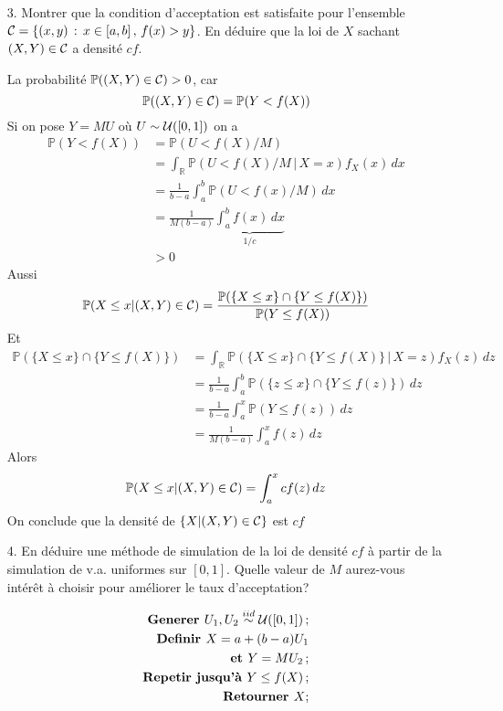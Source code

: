 \documentclass[a4paper]{article}
\begin{document}
\begin{enumerate}
\item[3.] Montrer que la condition d'acceptation est satisfaite pour l'ensemble ${\cal C} = \{(x,y)\,:\,x\in[a,b]\,,\,f(x)>y\}$. En d\'eduire que la loi de $X$ sachant $(X,Y)\in{\cal C}$ a densit\'e $cf$.

La probabilit\'e $\mathbb{P}((X,Y)\in{\cal C})>0$, car
$$\mathbb{P}((X,Y)\in{\cal C})= \mathbb{P}(Y<f(X))$$
Si on pose $Y = MU$ o\`u $U\sim{\cal U}([0,1])$ on a
\begin{align*}
\mathbb{P}(Y<f(X)) &= \mathbb{P}(U< f(X)/M)\\
&= \int_{\mathbb{R}}\mathbb{P}(U<f(X)/M\,|\,X=x)f_X(x)\,dx\\
&= \frac{1}{b-a}\int_a^b\mathbb{P}(U<f(x)/M)\,dx\\
&= \frac{1}{M(b-a)}\underbrace{\int_a^bf(x)\,dx}_{1/c}\\
&> 0
\end{align*}
Aussi
$$\mathbb{P}(X\leq x |(X,Y)\in{\cal C}) = \frac{\mathbb{P}(\{X\leq x\}\cap\{Y\leq f(X)\})}{\mathbb{P}(Y\leq f(X))}$$
Et
\begin{align*}
\mathbb{P}(\{X\leq x\}\cap\{Y\leq f(X)\}) &= \int_{\mathbb{R}}\mathbb{P}(\{X\leq x\}\cap \{Y\leq f(X)\}\,|\,X=z)f_X(z)\,dz\\
&= \frac{1}{b-a}\int_a^b\mathbb{P}(\{z\leq x\}\cap \{Y\leq f(z)\})\,dz\\
&= \frac{1}{b-a}\int_a^x\mathbb{P}(Y\leq f(z))\,dz\\
&= \frac{1}{M(b-a)}\int_a^xf(z)\,dz
\end{align*}
Alors $$\mathbb{P}(X\leq x|(X,Y)\in{\cal C}) = \int_a^xcf(z)\,dz$$
On conclude que la densit\'e de $\{X|(X,Y)\in{\cal C}\}$ est $cf$


\item[4.] En d\'eduire une m\'ethode de simulation de la loi de densit\'e $cf$ \`a partir de la simulation de v.a. uniformes sur $[0,1]$. Quelle valeur de $M$ aurez-vous int\'er\^et \`a choisir pour am\'eliorer le taux d'acceptation?

\begin{align*}
\textbf{Generer } U_1,U_2\stackrel{iid}{\sim}{\cal U}([0,1])\,;\\
\textbf{Definir } X = a+(b-a)U_1\\ \textbf{ et } Y = MU_2\,;\\
\textbf{Repetir jusqu'\`a } Y\leq f(X)\,;\\
\textbf{Retourner } X;
\end{align*}


\end{enumerate}
\end{document}
